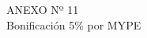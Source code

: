 \begin{center}
    \vspace*{\fill} %
    \Huge %
    ANEXO Nº 11 \\
    Bonificación 5\% por MYPE
    \vspace*{\fill} %
\end{center}